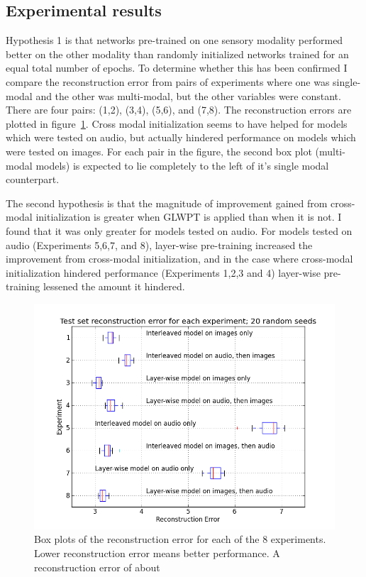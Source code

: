 \documentclass[12pt]{article}
\begin{document}
\begin{doublespacing}
	\subsection{Experimental results}
	Hypothesis 1 is that networks pre-trained on one sensory modality performed better on the other modality than randomly initialized networks trained for an equal total number of epochs. To determine whether this has been confirmed I compare the reconstruction error from pairs of experiments where one was single-modal and the other was multi-modal, but the other variables were constant. There are four pairs: (1,2), (3,4), (5,6), and (7,8). The reconstruction errors are plotted in figure~\ref{fig:boxplots}. Cross modal initialization seems to have helped for models which were tested on audio, but actually hindered performance on models which were tested on images. For each pair in the figure, the second box plot (multi-modal models) is expected to lie completely to the left of it's single modal counterpart.

The second hypothesis is that the magnitude of improvement gained from cross-modal initialization is greater when GLWPT is applied than when it is not. I found that it was only greater for models tested on audio. For models tested on audio (Experiments 5,6,7, and 8), layer-wise pre-training increased the improvement from cross-modal initialization, and in the case where cross-modal initialization hindered performance (Experiments 1,2,3 and 4) layer-wise pre-training lessened the amount it hindered.  
	
	
\begin{figure}[p]
\centering
\includegraphics[width=6in]{boxplot}
\caption{Box plots of the reconstruction error for each of the 8 experiments. Lower reconstruction error means better performance. A reconstruction error of about }
\label{fig:boxplots}
\end{figure}
	

\end{doublespacing}
\end{document}

